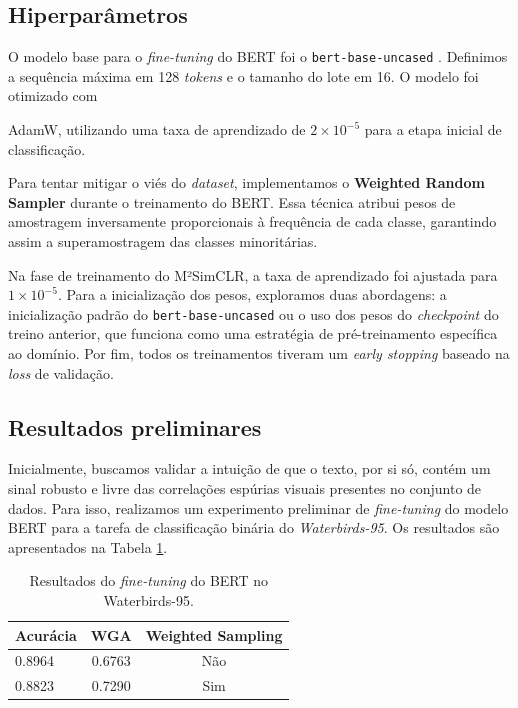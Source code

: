 \subsection{Hiperparâmetros}

O modelo base para o \textit{fine-tuning} do BERT foi o \texttt{bert-base-uncased} \cite{bert}. Definimos a sequência máxima em 128 \textit{tokens} e o tamanho do lote em 16. O modelo foi otimizado com {AdamW, utilizando uma taxa de aprendizado de $2 \times 10^{-5}$ para a etapa inicial de classificação.

Para tentar mitigar o viés do \textit{dataset}, implementamos o \textbf{Weighted Random Sampler} durante o treinamento do BERT. Essa técnica atribui pesos de amostragem inversamente proporcionais à frequência de cada classe, garantindo assim a superamostragem das classes minoritárias.

Na fase de treinamento do M²SimCLR, a taxa de aprendizado foi ajustada para $1 \times 10^{-5}$. Para a inicialização dos pesos, exploramos duas abordagens: a inicialização padrão do \texttt{bert-base-uncased} ou o uso dos pesos do \textit{checkpoint} do treino anterior, que funciona como uma estratégia de pré-treinamento específica ao domínio. Por fim, todos os treinamentos tiveram um \textit{early stopping} baseado na \textit{loss} de validação.

\subsection{Resultados preliminares}

Inicialmente, buscamos validar a intuição de que o texto, por si só, contém um sinal robusto e livre das correlações espúrias visuais presentes no conjunto de dados. Para isso, realizamos um experimento preliminar de \textit{fine-tuning} do modelo BERT para a tarefa de classificação binária do \textit{Waterbirds-95}. Os resultados são apresentados na Tabela \ref{tab:bert_waterbirds}.

\begin{table}[h]
\centering
\caption{Resultados do \textit{fine-tuning} do BERT no Waterbirds-95.}
\label{tab:bert_waterbirds}
\begin{tabular}{lcc}
\toprule
Acurácia & WGA & Weighted Sampling \\
\midrule
0.8964 & 0.6763 & Não \\
0.8823 & 0.7290 & Sim \\
\bottomrule
\end{tabular}
\end{table}

}
